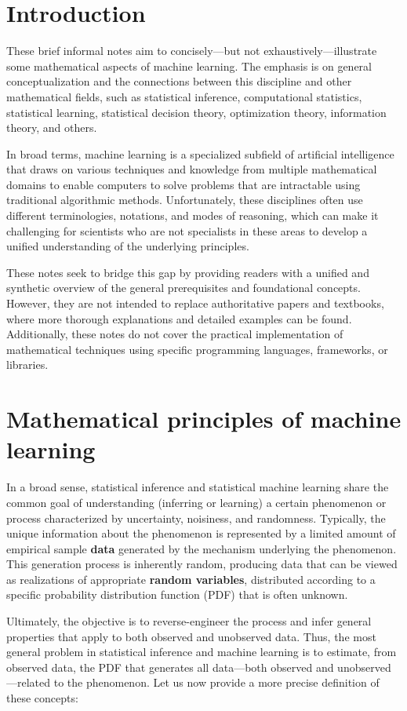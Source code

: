 \documentclass{report}
\begin{document}
\chapter*{Introduction}
These brief informal notes aim to concisely—but not exhaustively—illustrate some mathematical aspects of machine learning. The emphasis is on general conceptualization and the connections between this discipline and other mathematical fields, such as statistical inference, computational statistics, statistical learning, statistical decision theory, optimization theory, information theory, and others.

In broad terms, machine learning is a specialized subfield of artificial intelligence that draws on various techniques and knowledge from multiple mathematical domains to enable computers to solve problems that are intractable using traditional algorithmic methods. Unfortunately, these disciplines often use different terminologies, notations, and modes of reasoning, which can make it challenging for scientists who are not specialists in these areas to develop a unified understanding of the underlying principles.

These notes seek to bridge this gap by providing readers with a unified and synthetic overview of the general prerequisites and foundational concepts. However, they are not intended to replace authoritative papers and textbooks, where more thorough explanations and detailed examples can be found. Additionally, these notes do not cover the practical implementation of mathematical techniques using specific programming languages, frameworks, or libraries.

\chapter{Mathematical principles of machine learning}
In a broad sense, statistical inference and statistical machine learning share the common goal of understanding (inferring or learning) a certain phenomenon or process characterized by uncertainty, noisiness, and randomness. Typically, the unique information about the phenomenon is represented by a limited amount of empirical sample \textbf{data} generated by the mechanism underlying the phenomenon. This generation process is inherently random, producing data that can be viewed as realizations of appropriate \textbf{random variables}, distributed according to a specific probability distribution function (PDF) that is often unknown.

Ultimately, the objective is to reverse-engineer the process and infer general properties that apply to both observed and unobserved data. Thus, the most general problem in statistical inference and machine learning is to estimate, from observed data, the PDF that generates all data—both observed and unobserved—related to the phenomenon. Let us now provide a more precise definition of these concepts:
\end{document}

